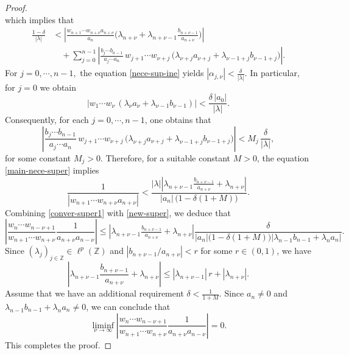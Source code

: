 \documentclass[12pt, reqno]{amsart}
\theoremstyle{definition}
\theoremstyle{remark}
\numberwithin{equation}{section}
\begin{document}
\begin{proof}
\[\]
which implies that
\begin{equation}\label{main-nece-super}
\begin{split}
\frac{1-\delta}{|\lambda|}
&<
\left|
\frac{w_{n+1}\cdots w_{n+\nu}a_{n+\nu}}{a_{n}}
\bigl(\lambda_{n+\nu}+\lambda_{n+\nu-1}\frac{b_{n+\nu-1}}{a_{n+\nu}}\bigr)
\right|\\
&\quad+ \sum_{j=0}^{n-1}
\left|
\frac{b_{j}\cdots b_{n-1}}{a_{j}\cdots a_{n}}\,
w_{j+1}\cdots w_{\nu+j}\,
\bigl(\lambda_{\nu+j}a_{\nu+j}+\lambda_{\nu-1+j}b_{\nu-1+j}\bigr)
\right|.
\end{split}
\end{equation}
For $j=0,\cdots, n-1,$ the equation \eqref{nece-sup-ine} yields  
$|\alpha_{j,\nu}|<\frac{\delta}{|\lambda|}.$
In particular, for $j=0$ we obtain  
\[
\left| w_{1}\cdots w_{\nu}\,(\lambda_{\nu}a_{\nu}+\lambda_{\nu-1}b_{\nu-1}) \right|
   <\frac{\delta\,|a_{0}|}{|\lambda|}.
\]
Consequently, for each $j=0,\cdots, n-1$, one obtains that 
\[
\left|
\frac{b_{j}\cdots b_{n-1}}{a_{j}\cdots a_{n}}\,
w_{j+1}\cdots w_{\nu+j}\,
\bigl(\lambda_{\nu+j}a_{\nu+j}
      +\lambda_{\nu-1+j}b_{\nu-1+j}\bigr)
\right|
< M_{j}\,\frac{\delta}{|\lambda|},
\]
for some constant $M_{j}>0$. Therefore, for a suitable constant $M>0$, the equation \eqref{main-nece-super} implies  
\begin{equation}\label{new-super}
    \frac{1}{\left|w_{n+1}\cdots w_{n+\nu} a_{n+\nu}\right|}
   <
   \frac{|\lambda|\left|\lambda_{n+\nu-1}\tfrac{b_{n+\nu-1}}{a_{n+\nu}}+\lambda_{n+\nu}\right|}
        {|a_{n}|\,\bigl(1-\delta(1+M)\bigr)}.
\end{equation}
Combining \eqref{conver-super1} with \eqref{new-super}, we deduce that  
\[
 \left\lvert 
         \frac{w_{n}\cdots w_{n-\nu+1}}{w_{n+1}\cdots w_{n+\nu}}\frac{1}{
          a_{n+\nu}a_{n-\nu}}
 \right\rvert
\leq 
\left|\lambda_{n+\nu-1}\tfrac{b_{n+\nu-1}}{a_{n+\nu}}+\lambda_{n+\nu}\right|
\frac{\delta}{|a_{n}|\bigl(1-\delta(1+M)\bigr)\left|\lambda_{n-1} b_{n-1}+\lambda_n a_n\right|}.
\]
Since $(\lambda_j)_{j\in\mathbb{Z}}\in \ell^{p}(\mathbb{Z})$ and  
$|b_{n+\nu-1}/a_{n+\nu}|<r$ for some $r\in(0,1)$, we have  
\[
\left|\lambda_{n+\nu-1}\frac{b_{n+\nu-1}}{a_{n+\nu}}+\lambda_{n+\nu}\right|
   \leq 
|\lambda_{n+\nu-1}|\, r + |\lambda_{n+\nu}|.
\]
Assume that we have an additional requirement $\delta<\tfrac{1}{1+M}$. Since $a_{n}\neq 0$ and   
$\lambda_{n-1}b_{n-1}+\lambda_n a_n\neq 0$, we can conclude that  
\[
\liminf_{\nu\to\infty}  
\left\lvert 
\frac{w_{n}\cdots w_{n-\nu+1}}{w_{n+1}\cdots w_{n+\nu}}\frac{1}{
          a_{n+\nu}a_{n-\nu}}
\right\rvert
= 0.
\]
This completes the proof.

   \end{proof}
   
\end{document}

